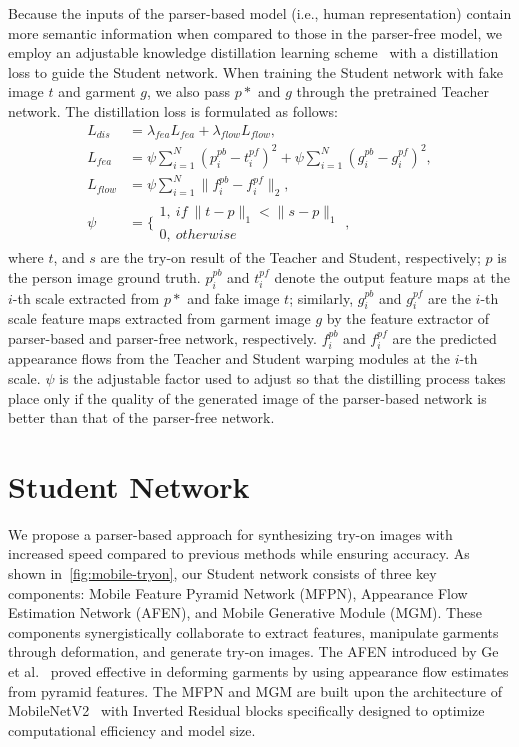 Because the inputs of the parser-based model (i.e., human representation) contain more semantic information when compared to those in the parser-free model, we employ an adjustable knowledge distillation learning scheme~\cite{Ge-CVPR2021-Parser} with a distillation loss to guide the Student network. When training the Student network with fake image $t$ and garment $g$, we also pass $p*$ and $g$ through the pretrained Teacher network. The distillation loss is formulated as follows:
\begin{align}
    L_{dis}  & = \lambda_{fea}L_{fea} + \lambda_{flow}L_{flow},\\
    L_{fea}  & = \psi \sum_{i=1}^N(p^{pb}_{i} - t^{pf}_{i})^2 + \psi \sum_{i=1}^N(g^{pb}_{i} - g^{pf}_{i})^2,\\
    L_{flow} & = \psi \sum_{i=1}^N\|f^{pb}_{i} - f^{pf}_{i}\|_{2},\\
    \psi     & = \{\begin{array}{l} 1, ~if~ \|t-p\|_1<\|s-p\|_1 \\ 0,~otherwise \end{array},
\end{align}
where $t$, and $s$ are the try-on result of the Teacher and Student, respectively; $p$ is the person image ground truth. $p^{pb}_{i}$ and $t^{pf}_{i}$ denote the output feature maps at the $i$-th scale extracted from $p*$ and fake image $t$; similarly, $g^{pb}_{i}$ and $g^{pf}_{i}$ are the $i$-th scale feature maps extracted from garment image $g$ by the feature extractor of parser-based and parser-free network, respectively. $f^{pb}_{i}$ and $f^{pf}_{i}$ are the predicted appearance flows from the Teacher and Student warping modules at the $i$-th scale. $\psi$ is the adjustable factor used to adjust so that the distilling process takes place only if the quality of the generated image of the parser-based network is better than that of the parser-free network.

\section{Student Network}

We propose a parser-based approach for synthesizing try-on images with increased speed compared to previous methods while ensuring accuracy. As shown in~\autoref{fig:mobile-tryon}, our Student network consists of three key components: Mobile Feature Pyramid Network (MFPN), Appearance Flow Estimation Network (AFEN), and Mobile Generative Module (MGM). These components synergistically collaborate to extract features, manipulate garments through deformation, and generate try-on images. The AFEN introduced by Ge et al.~\cite{Ge-CVPR2021-Parser} proved effective in deforming garments by using appearance flow estimates from pyramid features. The MFPN and MGM are built upon the architecture of MobileNetV2~\cite{Sandler-CVPR2018-Mobilenetv2} with Inverted Residual blocks specifically designed to optimize computational efficiency and model size.

